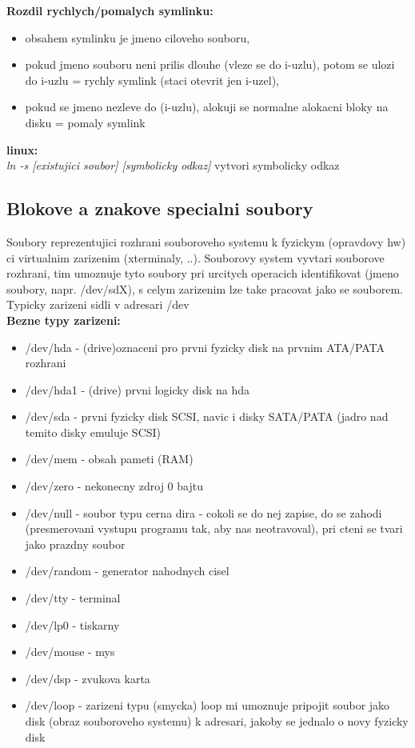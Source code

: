\documentclass[a4paper, 11pt]{article}
\begin{document}
\textbf{Rozdil rychlych/pomalych symlinku:}
\begin{itemize}
    \item obsahem symlinku je jmeno ciloveho souboru,
    \item pokud jmeno souboru neni prilis dlouhe (vleze se do i-uzlu), potom se ulozi do i-uzlu = rychly symlink (staci otevrit jen i-uzel),
    \item pokud se jmeno nezleve do (i-uzlu), alokuji se normalne alokacni bloky na disku = pomaly symlink \\
\end{itemize}

\textbf{linux:} \\[0.5em]
\textit{ln -s [existujici soubor] [symbolicky odkaz]} vytvori symbolicky odkaz \\

\newpage

\subsection{Blokove a znakove specialni soubory} \label{blok-char-hw}
Soubory reprezentujici rozhrani souboroveho systemu k fyzickym (opravdovy hw) ci virtualnim zarizenim (xterminaly, ..). Souborovy system vyvtari souborove rozhrani, tim umoznuje tyto soubory pri urcitych operacich identifikovat (jmeno soubory, napr. /dev/sdX), s celym zarizenim lze take pracovat jako se souborem. \\

Typicky zarizeni sidli v adresari /dev \\

\textbf{Bezne typy zarizeni:}
\begin{itemize}
    \item /dev/hda - (drive)oznaceni pro prvni fyzicky disk na prvnim ATA/PATA rozhrani
    \item /dev/hda1 - (drive) prvni logicky disk na hda
    \item /dev/sda - prvni fyzicky disk SCSI, navic i disky SATA/PATA (jadro nad temito disky emuluje SCSI)
    \item /dev/mem - obsah pameti (RAM)
    \item /dev/zero - nekonecny zdroj 0 bajtu
    \item /dev/null - soubor typu cerna dira - cokoli se do nej zapise, do se zahodi (presmerovani vystupu programu tak, aby nas neotravoval), pri cteni se tvari jako prazdny soubor
    \item /dev/random - generator nahodnych cisel
    \item /dev/tty - terminal
    \item /dev/lp0 - tiskarny
    \item /dev/mouse - mys
    \item /dev/dsp - zvukova karta
    \item /dev/loop - zarizeni typu (smycka) loop mi umoznuje pripojit soubor jako disk (obraz souboroveho systemu) k adresari, jakoby se jednalo o novy fyzicky disk \\
\end{itemize}
\end{document}
